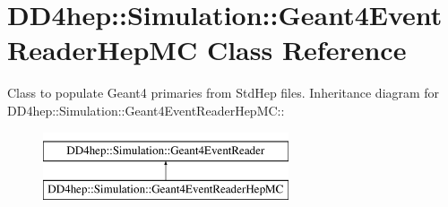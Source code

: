 \hypertarget{class_d_d4hep_1_1_simulation_1_1_geant4_event_reader_hep_m_c}{
\section{DD4hep::Simulation::Geant4EventReaderHepMC Class Reference}
\label{class_d_d4hep_1_1_simulation_1_1_geant4_event_reader_hep_m_c}
}


Class to populate Geant4 primaries from StdHep files.  
Inheritance diagram for DD4hep::Simulation::Geant4EventReaderHepMC::\begin{figure}[H]
\begin{center}
\leavevmode
\includegraphics[height=2cm]{class_d_d4hep_1_1_simulation_1_1_geant4_event_reader_hep_m_c}
\end{center}
\end{figure}
